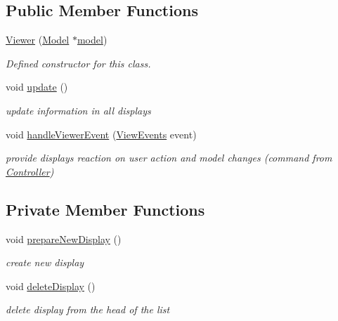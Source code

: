 \subsection*{Public Member Functions}
\begin{DoxyCompactItemize}
\item 
\hyperlink{class_viewer_a767681a73f280357e6401f469c17ca4a}{Viewer} (\hyperlink{class_model}{Model} $\ast$\hyperlink{class_viewer_a974fa8b6e46d1e09e334da06b769ab6b}{model})
\begin{DoxyCompactList}\small\item\em Defined constructor for this class. \end{DoxyCompactList}\item 
\mbox{\label{class_viewer_a7122ce13ef7b396ac8b7e471e4c82693}} 
void \hyperlink{class_viewer_a7122ce13ef7b396ac8b7e471e4c82693}{update} ()
\begin{DoxyCompactList}\small\item\em update information in all displays \end{DoxyCompactList}\item 
void \hyperlink{class_viewer_a84b2479e91627860dc69e0c24d453324}{handle\+Viewer\+Event} (\hyperlink{_events_8h_a7e30376069ab6f940d101ae67eb3fb34}{View\+Events} event)
\begin{DoxyCompactList}\small\item\em provide displays reaction on user action and model changes (command from \hyperlink{class_controller}{Controller}) \end{DoxyCompactList}\end{DoxyCompactItemize}
\subsection*{Private Member Functions}
\begin{DoxyCompactItemize}
\item 
\mbox{\label{class_viewer_a2726818329086632b258a855b22e55ac}} 
void \hyperlink{class_viewer_a2726818329086632b258a855b22e55ac}{prepare\+New\+Display} ()
\begin{DoxyCompactList}\small\item\em create new display \end{DoxyCompactList}\item 
\mbox{\label{class_viewer_a6ee06f2f80d48076c42208250c017663}} 
void \hyperlink{class_viewer_a6ee06f2f80d48076c42208250c017663}{delete\+Display} ()
\begin{DoxyCompactList}\small\item\em delete display from the head of the list \end{DoxyCompactList}\end{DoxyCompactItemize}
